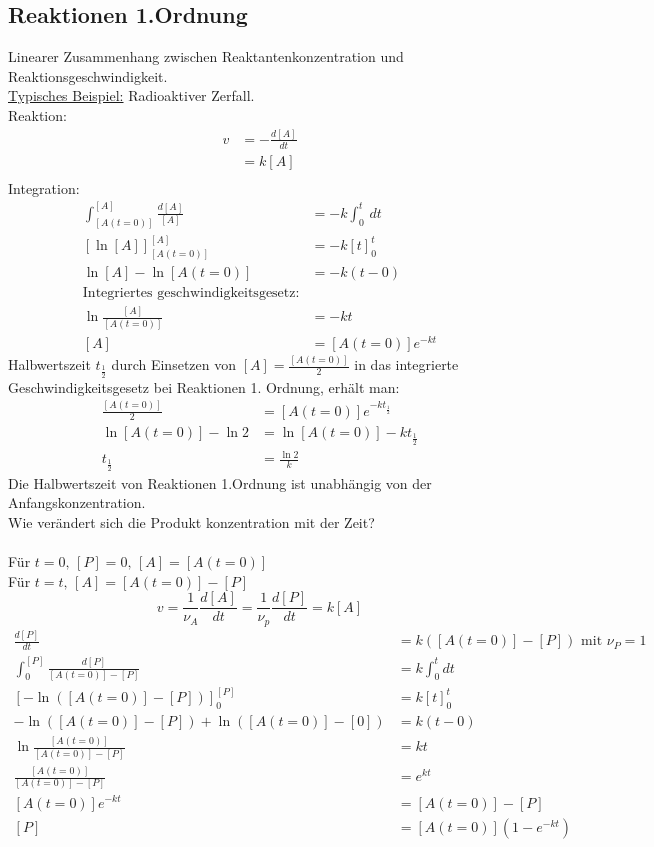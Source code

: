 \documentclass[a4paper, fleqn]{article}
\begin{document}
\subsection{Reaktionen 1.Ordnung}
Linearer Zusammenhang zwischen Reaktantenkonzentration und Reaktionsgeschwindigkeit.\\
\underline{Typisches Beispiel:} Radioaktiver Zerfall.\\
Reaktion: \\
\begin{align*}
    v &= -\frac{d[A]}{dt}\\
    &= k[A]\\
\end{align*}
Integration:
\begin{align*}
    \int_{[A(t=0)]}^{[A]}\frac{d[A]}{[A]} &= -k\int_{0}^{t}\,dt\\
    \left[\ln [A]\right]_{[A(t=0)]}^{[A]} &= -k[t]_0^t\\
    \ln [A] - \ln [A(t=0)] &= -k(t-0)\\
    \text{Integriertes geschwindigkeitsgesetz:}\\
    \ln \frac{[A]}{[A(t=0)]} &= -kt\\
    [A] &= [A(t=0)]e^{-kt}
\end{align*}
Halbwertszeit $t_\frac{1}{2}$ durch Einsetzen von $[A] = \frac{[A(t=0)]}{2}$ in das integrierte Geschwindigkeitsgesetz bei Reaktionen 1. Ordnung, erhält man:\\
\begin{align*}
    \frac{[A(t=0)]}{2} &= [A(t=0)]e^{-kt_\frac{1}{2}}\\
    \ln [A(t=0)] - \ln 2 &= \ln [A(t=0)] - kt_\frac{1}{2}\\
    t_\frac{1}{2} &= \frac{\ln 2}{k}
\end{align*}
Die Halbwertszeit von Reaktionen 1.Ordnung ist unabhängig von der Anfangskonzentration.\\
Wie verändert sich die Produkt konzentration mit der Zeit?\\
\\
Für $t=0,\, [P]=0,\, [A]=[A(t=0)]$\\
Für $t=t,\, [A] = [A(t=0)]-[P]$\\
\begin{equation*}
    v = \frac{1}{\nu_A}\frac{d[A]}{dt} = \frac{1}{\nu_p}\frac{d[P]}{dt} = k[A]
\end{equation*}
\begin{align*}
    \frac{d[P]}{dt} &= k([A(t=0)]-[P]) \text{ mit } \nu_P = 1\\
    \int_{0}^{[P]} \frac{d[P]}{[A(t=0)]-[P]} &= k \int_{0}^{t} dt\\
    \left[-\ln \left([A(t=0)]-[P]\right)\right]_0^{[P]} &= k[t]_0^t\\
    -\ln \left([A(t=0)]-[P]\right) + \ln ([A(t=0)]-[0]) &= k(t-0)\\
    \ln \frac{[A(t=0)]}{[A(t=0)]-[P]} &= kt\\
    \frac{[A(t=0)]}{[A(t=0)]-[P]} &= e^{kt}\\
    [A(t=0)]e^{-kt} &= [A(t=0)]-[P]\\
    [P] &= [A(t=0)]\left(1-e^{-kt}\right)
\end{align*}
\end{document}
